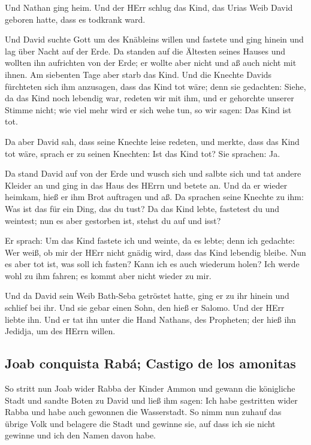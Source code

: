  Und Nathan ging heim. Und der HErr schlug das Kind, das
Urias Weib David geboren hatte, dass es todkrank ward.

 Und David suchte Gott um des Knäbleins willen und
fastete und ging hinein und lag über Nacht auf der Erde. 
Da standen auf die Ältesten seines Hauses und wollten ihn aufrichten von
der Erde; er wollte aber nicht und aß auch nicht mit ihnen.
 Am siebenten Tage aber starb das Kind. Und die Knechte
Davids fürchteten sich ihm anzusagen, dass das Kind tot wäre; denn sie
gedachten: Siehe, da das Kind noch lebendig war, redeten wir mit ihm,
und er gehorchte unserer Stimme nicht; wie viel mehr wird er sich wehe
tun, so wir sagen: Das Kind ist tot.

 Da aber David sah, dass seine Knechte leise redeten, und
merkte, dass das Kind tot wäre, sprach er zu seinen Knechten: Ist das
Kind tot? Sie sprachen: Ja.

 Da stand David auf von der Erde und wusch sich und
salbte sich und tat andere Kleider an und ging in das Haus des HErrn und
betete an. Und da er wieder heimkam, hieß er ihm Brot auftragen und aß.
 Da sprachen seine Knechte zu ihm: Was ist das für ein
Ding, das du tust? Da das Kind lebte, fastetest du und weintest; nun es
aber gestorben ist, stehst du auf und isst?

 Er sprach: Um das Kind fastete ich und weinte, da es
lebte; denn ich gedachte: Wer weiß, ob mir der HErr nicht gnädig wird,
dass das Kind lebendig bleibe.  Nun es aber tot ist, was
soll ich fasten? Kann ich es auch wiederum holen? Ich werde wohl zu ihm
fahren; es kommt aber nicht wieder zu mir.

 Und da David sein Weib Bath-Seba getröstet hatte, ging
er zu ihr hinein und schlief bei ihr. Und sie gebar einen Sohn, den hieß
er Salomo. Und der HErr liebte ihn.  Und er tat ihn unter
die Hand Nathans, des Propheten; der hieß ihn Jedidja, um des HErrn
willen.

\hypertarget{joab-conquista-rabuxe1-castigo-de-los-amonitas}{%
\subsection{Joab conquista Rabá; Castigo de los
amonitas}\label{joab-conquista-rabuxe1-castigo-de-los-amonitas}}

 So stritt nun Joab wider Rabba der Kinder Ammon und
gewann die königliche Stadt  und sandte Boten zu David
und ließ ihm sagen: Ich habe gestritten wider Rabba und habe auch
gewonnen die Wasserstadt.  So nimm nun zuhauf das übrige
Volk und belagere die Stadt und gewinne sie, auf dass ich sie nicht
gewinne und ich den Namen davon habe.

